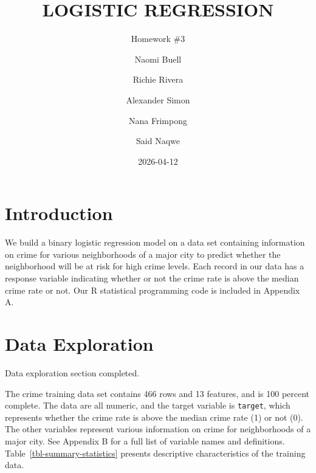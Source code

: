 \documentclass[
  11pt]{article}
\title{LOGISTIC REGRESSION}
\subtitle{Homework \#3}
\author{Naomi Buell \and Richie Rivera \and Alexander Simon \and Nana
Frimpong \and Said Naqwe}
\date{2026-04-12}
\begin{document}
\maketitle


\section{Introduction}\label{introduction}

We build a binary logistic regression model on a data set containing
information on crime for various neighborhoods of a major city to
predict whether the neighborhood will be at risk for high crime levels.
Each record in our data has a response variable indicating whether or
not the crime rate is above the median crime rate or not. Our R
statistical programming code is included in Appendix A.

\section{Data Exploration}\label{data-exploration}

\begin{tcolorbox}[enhanced jigsaw, titlerule=0mm, title=\textcolor{quarto-callout-note-color}{\faInfo}\hspace{0.5em}{Note}, toptitle=1mm, colframe=quarto-callout-note-color-frame, colback=white, coltitle=black, opacityback=0, bottomtitle=1mm, opacitybacktitle=0.6, leftrule=.75mm, rightrule=.15mm, colbacktitle=quarto-callout-note-color!10!white, arc=.35mm, toprule=.15mm, left=2mm, breakable, bottomrule=.15mm]

Data exploration section completed.

\end{tcolorbox}

The crime training data set contains 466 rows and 13 features, and is
100 percent complete. The data are all numeric, and the target variable
is \texttt{target}, which represents whether the crime rate is above the
median crime rate (1) or not (0). The other variables represent various
information on crime for neighborhoods of a major city. See Appendix B
for a full list of variable names and definitions.
Table~\ref{tbl-summary-statistics} presents descriptive characteristics
of the training data.
\end{document}
